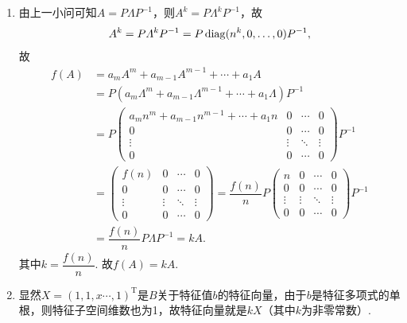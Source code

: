 \begin{exercise}
\begin{exgroup}
\begin{answer}
\begin{enumerate}
                \item 由上一小问可知$A=P\varLambda P^{-1}$，则$A^k=P\varLambda^kP^{-1}$，故
                      \[A^k=P\varLambda^kP^{-1}=P\operatorname{diag}(n^k,0,\ldots,0)P^{-1},\]
                      故
                      \begin{align*}
                          f(A) & =a_mA^m+a_{m-1}A^{m-1}+\cdots+a_1A                                                                                                   \\
                               & =P(a_m\varLambda^m+a_{m-1}\varLambda^{m-1}+\cdots+a_1\varLambda)P^{-1}                                                               \\
                               & =P\begin{pmatrix}
                                       a_mn^m+a_{m-1}n^{m-1}+\cdots+a_1n & 0 & \cdots & 0 \\ 0 & 0 & \cdots & 0 \\ \vdots & \vdots & \ddots & \vdots \\ 0 & 0 & \cdots & 0
                                   \end{pmatrix}P^{-1} \\
                               & =\begin{pmatrix}
                                      f(n) & 0 & \cdots & 0 \\ 0 & 0 & \cdots & 0 \\ \vdots & \vdots & \ddots & \vdots \\ 0 & 0 & \cdots & 0
                                  \end{pmatrix}=\dfrac{f(n)}{n}P\begin{pmatrix}
                                                                    n & 0 & \cdots & 0 \\ 0 & 0 & \cdots & 0 \\ \vdots & \vdots & \ddots & \vdots \\ 0 & 0 & \cdots & 0
                                                                \end{pmatrix}P^{-1}    \\
                               & =\dfrac{f(n)}{n}P\varLambda P^{-1}=kA.
                      \end{align*}
                      其中$k=\dfrac{f(n)}{n}$. 故$f(A)=kA$.

                \item 显然$X=(1,1,x\cdots,1)^\mathrm{T}$是$B$关于特征值$b$的特征向量，由于$b$是特征多项式的单根，则特征子空间维数也为1，故特征向量就是$kX$（其中$k$为非零常数）.


\end{enumerate}
\end{answer}
\end{exgroup}
\end{exercise}
